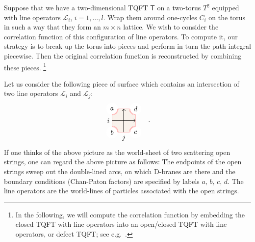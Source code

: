 Suppose that we have a two-dimensional TQFT $\mathsf{T}$ on a two-torus
$T^{2}$ equipped with line operators $\mathcal{L}_{i}$, $i=1,\ldots,l$.
Wrap them around one-cycles $C_{i}$ on the torus in such a way that
they form an $m\times n$ lattice. We wish to consider the correlation
function of this configuration of line operators. To compute it, our
strategy is to break up the torus into pieces and perform in turn
the path integral piecewise. Then the original correlation function
is reconstructed by combining these pieces.%
%
\footnote{In the following, we will compute the correlation function by embedding
the closed TQFT with line operators into an open/closed TQFT with
line operators, or defect TQFT; see e.g.~\cite{Moore:2006dw,Carqueville:2016nqk}. }
%

Let us consider the following piece of surface which contains an intersection
of two line operators $\mathcal{L}_{i}$ and $\mathcal{L}_{j}$:
\begin{equation}
  \label{eq:piece_of_lines}
    \begin{tikzpicture}[scale=0.6, baseline=(x.base)]
        \node (x) at (0,0) {\vphantom{x}};

        \draw[color=red!50, fill=brown!10] (-1,-1) rectangle (1,1);

        \fill[color=white] (-1,1) circle (0.5);  \node (a) at (-1,1) {$a$};
        \draw[draw=red!50, double]  (-1,0.5) arc (-90:0:0.5);
        \fill[color=white] (-1,-1) circle (0.5);  \node (b) at (-1,-1) {$b$};
        \draw[draw=red!50, double]  (-1,-0.5) arc (90:0:0.5);
        \fill[color=white] (1,-1) circle (0.5);  \node (c) at (1,-1) {$c$};
        \draw[draw=red!50, double]  (1,-0.5) arc (90:180:0.5);
        \fill[color=white] (1,1) circle (0.5);  \node (d) at (1,1) {$d$};
        \draw[draw=red!50, double]  (1,0.5) arc (-90:-180:0.5);

        \draw[thick, ->] (-1,0) node[left] {$i$} -- (1,0);
        \draw[thick, ->] (0,-1) node[below] {$j$} -- (0,1);

    \end{tikzpicture}
  \quad .
\end{equation}
 If one thinks of the above picture as the world-sheet of two scattering
open strings, one can regard the above picture as follows: The endpoints
of the open strings sweep out the double-lined arcs, on which D-branes
are there and the boundary conditions (Chan-Paton factors) are specified
by labels $a,\,b,\,c,\,d$. The line operators are the world-lines
of particles associated with the open strings.


